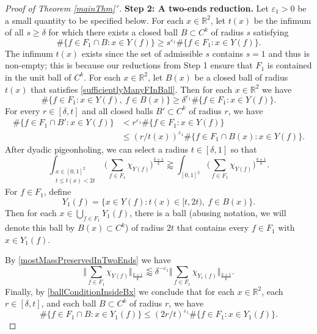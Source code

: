 \documentclass[letterpaper, reqno,11pt]{article}
\numberwithin{equation}{section}
\newcommand{\RR}{\mathbb{R}}
\newcommand{\eps}{\varepsilon}
\numberwithin{thm}{section}
\theoremstyle{remark}
\begin{document}
\begin{proof}[Proof of Theorem \ref{mainThm}\,$'$]
\noindent\textbf{Step 2: A two-ends reduction.} Let $\eps_1>0$ be a small quantity to be specified below. For each $x\in\RR^2$, let $t(x)$ be the infimum of all $s\geq\delta$ for which there exists a closed ball $B\subset C^k$ of radius $s$ satisfying
\begin{equation}\label{sufficientlyManyFInBall}
\#\{f\in F_1 \cap B\colon x\in Y(f)\}\geq s^{\eps_1}\#\{f\in F_1\colon x\in Y(f)\}.
\end{equation}
The infimum $t(x)$ exists since the set of admissible $s$ contains $s=1$ and thus is non-empty; this is because our reductions from Step 1 ensure that $F_1$ is contained in the unit ball of $C^k$. For each $x\in\RR^2$, let $B(x)$ be a closed ball of radius $t(x)$ that satisfies \eqref{sufficientlyManyFInBall}. Then for each $x\in\RR^2$ we have
\begin{equation}\label{mostMassPreservedInTwoEnds}
\#\{f\in F_1\colon x\in Y(f),\ f\in B(x)\} \geq \delta^{\eps_1}\#\{f\in F_1\colon x\in Y(f)\}.
\end{equation}
%
For every $r\in[\delta,t]$ and all closed balls $B'\subset C^k$ of radius $r$, we have
\begin{equation}\label{ballConditionInsideBx}
\begin{split}
\#\{f\in F_1 \cap B'\colon x\in Y(f)\} & < r^{\eps_1}\#\{f\in F_1\colon x\in Y(f)\}\\
& \leq (r/t(x))^{\eps_1}\#\{f\in F_1\cap B(x)\colon x\in Y(f)\}.
\end{split}
\end{equation}
After dyadic pigeonholing, we can select a radius $t\in[\delta,1]$ so that
\[
\int_{\substack{x\in[0,1]^2 \\ t\leq t(x)< 2t}} \Big(\sum_{f\in F_1}\chi_{Y(f)}\Big)^{\frac{k+1}{k}}\gtrapprox \int_{[0,1]^2} \Big(\sum_{f\in F_1}\chi_{Y(f)}\Big)^{\frac{k+1}{k}}.
\]
For $f\in F_1$, define
\[
Y_1(f) = \{ x\in Y(f)\colon  t(x)\in[t, 2t),\ f\in B(x)\}.
\]
Then for each $x\in \bigcup_{f\in F_1}Y_1(f)$, there is a ball (abusing notation, we will denote this ball by $B(x)\subset C^k$) of radius $2t$ that contains every $f\in F_1$ with $x\in Y_1(f)$. 

By \eqref{mostMassPreservedInTwoEnds} we have 
\begin{equation}\label{LkBdControlledBySumOverShading}
        \Big\Vert \sum_{f\in F_1} \chi_{Y(f)} \Big\Vert_{\frac{k+1}{k}}  \lessapprox \delta^{-\eps_1}\Big\Vert \sum_{f\in F_1} \chi_{Y_1(f)} \Big\Vert_{\frac{k+1}{k}}.
 \end{equation}
 Finally, by \eqref{ballConditionInsideBx} we conclude that for each $x\in \RR^2$, each $r\in[\delta,t]$, and each ball $B\subset C^k$ of radius $r$, we have
 \begin{equation}\label{twoEndsBallStep2}
       \#\{f\in F_1 \cap B\colon x\in Y_1(f) \}\leq (2r/t)^{\eps_1}\#\{f\in F_1\colon x\in Y_1(f)\}.
 \end{equation}





\end{proof}
\end{document}
